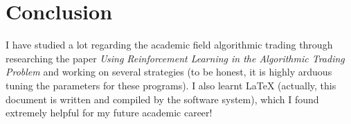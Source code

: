 \documentclass[12pt, letterpaper, oneside]{article}
\begin{document}
\section{Conclusion}
I have studied a lot regarding the academic field algorithmic trading through researching the paper \textit{Using Reinforcement Learning in the Algorithmic Trading Problem} and working on several strategies (to be honest, it is highly arduous tuning the parameters for these programs). I also learnt \LaTeX{} (actually, this document is written and compiled by the software system), which I found extremely helpful for my future academic career!

\medskip



\end{document}
